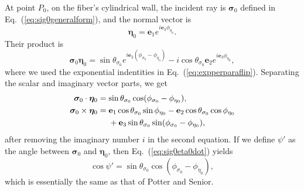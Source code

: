\documentclass[a4paper,twocolumn,superscriptaddress]{revtex4-1}
\begin{document}
{At point $P_0$, on the fiber's cylindrical wall, the incident ray is $\bm \sigma_0$ defined in Eq.~(\ref{eq:sig0generalform}), and the normal vector is 
\begin{equation}
\bm \eta_0 = \mathbf e_1 e^{i \mathbf e_3 \phi_{\eta_0}} .
\end{equation}
Their product is
\begin{equation}
	\bm \sigma_0 \bm  \eta_0 = \sin \theta_{ \sigma_0 } e^{i \mathbf e_3 (\phi_{ \sigma_0 } - \phi_{ \eta_0 })} - i \cos \theta_{ \sigma_0 } \mathbf e_2 e^{i \mathbf e_3 \phi_{ \eta_0 }} ,
\end{equation}
where we used the exponential indentities in Eq.~(\ref{eq:expperparaflip}).
Separating the scalar and imaginary vector parts, we get
\begin{align}
\label{eq:sig0eta0dot}
	\bm \sigma_0 \cdot \bm \eta_0 &= \sin \theta_{ \sigma_0 } \cos (\phi_{ \sigma_0 } - \phi_{ \eta_0 }) ,
\\
	\bm \sigma_0 \times \bm \eta_0 &= 
	\mathbf e_1 \cos \theta_{ \sigma_0 } \sin \phi_{ \eta_0 } - 
  \mathbf e_2 \cos \theta_{ \sigma_0 }  \cos \phi_{ \eta_0 }  \notag
\\ & \quad	 \,\,
  + \mathbf e_3 \sin \theta_{ \sigma_0 } \sin (\phi_{ \sigma_0 } - \phi_{ \eta_0 }) , 
\end{align}
after removing the imaginary number $i$ in the second equation. If we define $\psi'$ as the angle between $\bm \sigma_0$ and $\bm \eta_0$, then Eq.~(\ref{eq:sig0eta0dot}) yields
\begin{equation}
\label{eq:cospsipri}
\cos \psi' = \sin \theta_{ \sigma_0 } \cos (\phi_{ \sigma_0 } - \phi_{ \eta_0 }) ,
\end{equation}
which is essentially the same as that of Potter\cite{Potter} and Senior\cite{senior}.

}
\end{document}
